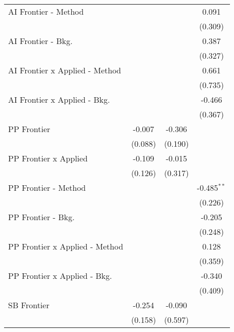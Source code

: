 \begin{tabular}{lccc}
   AI Frontier - Method           &              &               & 0.091\\   
                                  &              &               & (0.309)\\   
   AI Frontier - Bkg.             &              &               & 0.387\\   
                                  &              &               & (0.327)\\   
   AI Frontier x Applied - Method &              &               & 0.661\\   
                                  &              &               & (0.735)\\   
   AI Frontier x Applied - Bkg.   &              &               & -0.466\\   
                                  &              &               & (0.367)\\   
   PP Frontier                    & -0.007       & -0.306        &   \\   
                                  & (0.088)      & (0.190)       &   \\   
   PP Frontier x Applied          & -0.109       & -0.015        &   \\   
                                  & (0.126)      & (0.317)       &   \\   
   PP Frontier - Method           &              &               & -0.485$^{**}$\\   
                                  &              &               & (0.226)\\   
   PP Frontier - Bkg.             &              &               & -0.205\\   
                                  &              &               & (0.248)\\   
   PP Frontier x Applied - Method &              &               & 0.128\\   
                                  &              &               & (0.359)\\   
   PP Frontier x Applied - Bkg.   &              &               & -0.340\\   
                                  &              &               & (0.409)\\   
   SB Frontier                    & -0.254       & -0.090        &   \\   
                                  & (0.158)      & (0.597)       &   \\   

\end{tabular}
